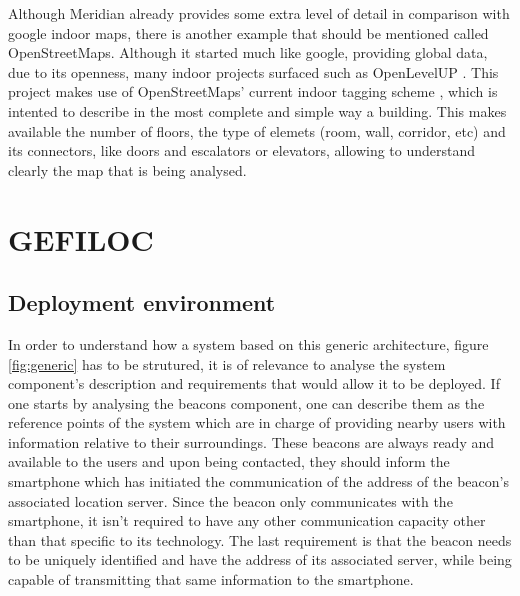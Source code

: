 \documentclass[a4paper]{IEEEtran}
\begin{document}
Although Meridian already provides some extra level of detail in comparison with google indoor maps, there is another example that should be mentioned called OpenStreetMaps. Although it started much like google, providing global data, due to its openness, many indoor projects surfaced such as OpenLevelUP \cite{openlevel}. This project makes use of OpenStreetMaps' current indoor tagging scheme \cite{opentagging}, which is intented to describe in the most complete and simple way a building. This makes available the number of floors, the type of elemets (room, wall, corridor, etc) and its connectors, like doors and escalators or elevators, allowing to understand clearly the map that is being analysed.

\section{GEFILOC}
\label{sec:system}


\subsection{Deployment environment}
\label{subsec:deployment}

In order to understand how a system based on this generic architecture, figure \ref{fig:generic} has to be strutured, it is of relevance to analyse the system component's description and requirements that would allow it to be deployed. If one starts by analysing the beacons component, one can describe them as the reference points of the system which are in charge of providing nearby users with information relative to their surroundings. These beacons are always ready and available to the users and upon being contacted, they should inform the smartphone which has initiated the communication of the address of the beacon's associated location server. Since the beacon only communicates with the smartphone, it isn't required to have any other communication capacity other than that specific to its technology. The last requirement is that the beacon needs to be uniquely identified and have the address of its associated server, while being capable of transmitting that same information to the smartphone.
\end{document}
